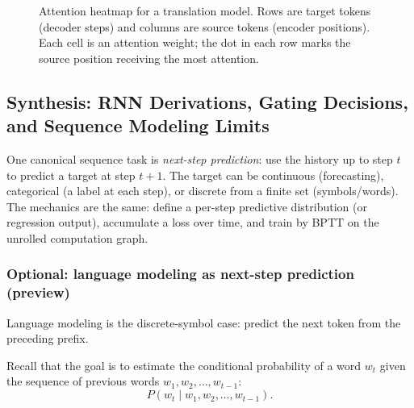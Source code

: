 \begin{figure}[t]
    \caption{Attention heatmap for a translation model. Rows are target tokens (decoder steps) and columns are source tokens (encoder positions). Each cell is an attention weight; the dot in each row marks the source position receiving the most attention.}
    \label{fig:lec7-attention}
\end{figure}


\subsection{Synthesis: RNN Derivations, Gating Decisions, and Sequence Modeling Limits}
\label{sec:rnn_wrapping_up_the_derivations}

One canonical sequence task is \emph{next-step prediction}: use the history up to step \(t\) to predict a target at step \(t+1\). The target can be continuous (forecasting), categorical (a label at each step), or discrete from a finite set (symbols/words). The mechanics are the same: define a per-step predictive distribution (or regression output), accumulate a loss over time, and train by BPTT on the unrolled computation graph.

\subsubsection{Optional: language modeling as next-step prediction (preview)}
\label{sec:rnn_optional_language_modeling_preview}
Language modeling is the discrete-symbol case: predict the next token from the preceding prefix.

Recall that the goal is to estimate the conditional probability of a word \( w_t \) given the sequence of previous words \( w_1, w_2, \ldots, w_{t-1} \):
\[
    P(w_t \mid w_1, w_2, \ldots, w_{t-1}).
\]

